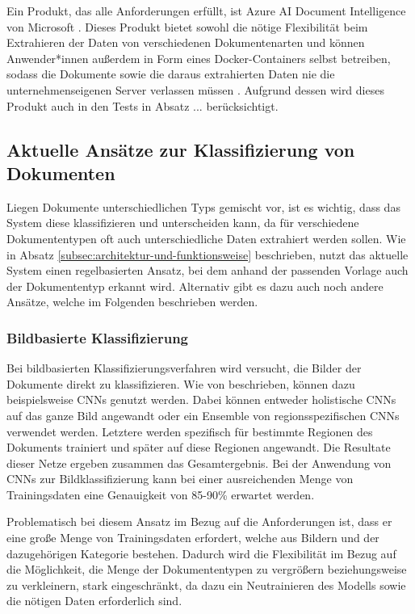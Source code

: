 Ein Produkt, das alle Anforderungen erfüllt, ist Azure AI Document Intelligence von Microsoft \parencite{microsoft_azureai_documentintelligence}. Dieses Produkt bietet sowohl die nötige Flexibilität beim Extrahieren der Daten von verschiedenen Dokumentenarten und können Anwender*innen außerdem in Form eines Docker-Containers selbst betreiben, sodass die Dokumente sowie die daraus extrahierten Daten nie die unternehmenseigenen Server verlassen müssen \parencite{microsoft_azureai_documentintelligence_containers}. Aufgrund dessen wird dieses Produkt auch in den Tests in Absatz ... berücksichtigt.

\subsection{Aktuelle Ansätze zur Klassifizierung von Dokumenten}
\label{subsec:aktuelle-ansätze-zur-klassifizierung-von-dokumenten}

Liegen Dokumente unterschiedlichen Typs gemischt vor, ist es wichtig, dass das System diese klassifizieren und unterscheiden kann, da für verschiedene Dokumententypen oft auch unterschiedliche Daten extrahiert werden sollen. Wie in Absatz \ref{subsec:architektur-und-funktionsweise} beschrieben, nutzt das aktuelle System einen regelbasierten Ansatz, bei dem anhand der passenden Vorlage auch der Dokumententyp erkannt wird. Alternativ gibt es dazu auch noch andere Ansätze, welche im Folgenden beschrieben werden.

\subsubsection{Bildbasierte Klassifizierung}
\label{subsubsec:bild-basierte-klassifizieurng}

Bei bildbasierten Klassifizierungsverfahren wird versucht, die Bilder der Dokumente direkt zu klassifizieren. Wie von \textcite{HarleyAdamW2015EoDC} beschrieben, können dazu beispielsweise CNNs genutzt werden. Dabei können entweder holistische CNNs auf das ganze Bild angewandt oder ein Ensemble von regionsspezifischen CNNs verwendet werden. Letztere werden spezifisch für bestimmte Regionen des Dokuments trainiert und später auf diese Regionen angewandt. Die Resultate dieser Netze ergeben zusammen das Gesamtergebnis. Bei der Anwendung von CNNs zur Bildklassifizierung kann bei einer ausreichenden Menge von Trainingsdaten eine Genauigkeit von 85-90\% erwartet werden.

Problematisch bei diesem Ansatz im Bezug auf die Anforderungen ist, dass er eine große Menge von Trainingsdaten erfordert, welche aus Bildern und der dazugehörigen Kategorie bestehen. Dadurch wird die Flexibilität im Bezug auf die Möglichkeit, die Menge der Dokumententypen zu vergrößern beziehungsweise zu verkleinern, stark eingeschränkt, da dazu ein Neutrainieren des Modells sowie die nötigen Daten erforderlich sind.

